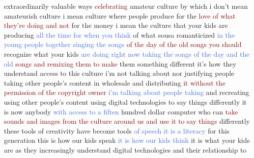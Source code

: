 extraordinarily valuable ways \textcolor{Maroon}{celebrating} amateur culture by which i don't mean amateurish culture i mean culture where people produce for the \textcolor{Maroon}{love} \textcolor{Maroon}{of} \textcolor{Maroon}{what} \textcolor{Maroon}{they're} \textcolor{Maroon}{doing} \textcolor{Maroon}{and} \textcolor{Maroon}{not} for the money i mean the culture that your kids are producing \textcolor{RoyalBlue}{all} \textcolor{RoyalBlue}{the} \textcolor{RoyalBlue}{time} \textcolor{RoyalBlue}{for} \textcolor{RoyalBlue}{when} \textcolor{RoyalBlue}{you} \textcolor{RoyalBlue}{think} of what sousa romanticized \textcolor{RoyalBlue}{in} \textcolor{RoyalBlue}{the} \textcolor{RoyalBlue}{young} \textcolor{RoyalBlue}{people} \textcolor{RoyalBlue}{together} \textcolor{RoyalBlue}{singing} \textcolor{RoyalBlue}{the} \textcolor{RoyalBlue}{songs} \textcolor{Maroon}{of} \textcolor{Maroon}{the} \textcolor{Maroon}{day} \textcolor{Maroon}{of} \textcolor{Maroon}{the} \textcolor{Maroon}{old} \textcolor{Maroon}{songs} \textcolor{Maroon}{you} \textcolor{Maroon}{should} recognize what your kids \textcolor{RoyalBlue}{are} \textcolor{RoyalBlue}{doing} \textcolor{RoyalBlue}{right} \textcolor{RoyalBlue}{now} \textcolor{RoyalBlue}{taking} \textcolor{RoyalBlue}{the} \textcolor{RoyalBlue}{songs} \textcolor{RoyalBlue}{of} \textcolor{RoyalBlue}{the} \textcolor{RoyalBlue}{day} \textcolor{RoyalBlue}{and} \textcolor{RoyalBlue}{the} \textcolor{RoyalBlue}{old} \textcolor{Maroon}{songs} \textcolor{Maroon}{and} \textcolor{Maroon}{remixing} \textcolor{Maroon}{them} \textcolor{Maroon}{to} \textcolor{Maroon}{make} them something different it's how they understand access to this culture i'm not talking about nor justifying people taking other people's content in wholesale and distributing \textcolor{Maroon}{it} \textcolor{Maroon}{without} \textcolor{Maroon}{the} \textcolor{Maroon}{permission} \textcolor{Maroon}{of} \textcolor{Maroon}{the} \textcolor{Maroon}{copyright} \textcolor{Maroon}{owner} \textcolor{RoyalBlue}{i'm} \textcolor{RoyalBlue}{talking} \textcolor{RoyalBlue}{about} \textcolor{RoyalBlue}{people} \textcolor{RoyalBlue}{taking} and recreating using other people's content using digital technologies to say things differently it is now anybody \textcolor{RoyalBlue}{with} \textcolor{RoyalBlue}{access} \textcolor{RoyalBlue}{to} \textcolor{RoyalBlue}{a} \textcolor{RoyalBlue}{fiften} hundred dollar computer who can \textcolor{Maroon}{take} \textcolor{Maroon}{sounds} \textcolor{Maroon}{and} \textcolor{Maroon}{images} \textcolor{Maroon}{from} \textcolor{Maroon}{the} \textcolor{Maroon}{culture} \textcolor{Maroon}{around} \textcolor{Maroon}{us} \textcolor{Maroon}{and} \textcolor{Maroon}{use} \textcolor{Maroon}{it} \textcolor{Maroon}{to} \textcolor{Maroon}{say} \textcolor{Maroon}{things} differently these tools of creativity have become tools \textcolor{RoyalBlue}{of} \textcolor{RoyalBlue}{speech} \textcolor{RoyalBlue}{it} \textcolor{RoyalBlue}{is} \textcolor{RoyalBlue}{a} \textcolor{RoyalBlue}{literacy} for this generation this is how our kids speak \textcolor{RoyalBlue}{it} \textcolor{RoyalBlue}{is} \textcolor{RoyalBlue}{how} \textcolor{RoyalBlue}{our} \textcolor{RoyalBlue}{kids} \textcolor{RoyalBlue}{think} it is what your kids are as they increasingly understand digital technologies and their relationship to 